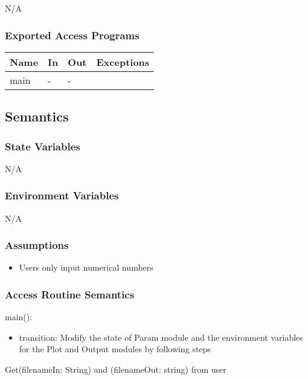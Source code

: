 \documentclass[12pt, titlepage]{article}
\begin{document}
N/A
\subsubsection{Exported Access Programs}

\begin{center}
\begin{tabular}{p{4cm} p{2cm} p{2cm} p{6cm}}
\hline
\textbf{Name} & \textbf{In} & \textbf{Out} & \textbf{Exceptions} \\
\hline
main & - & - &  \\
\hline
\end{tabular}
\end{center}

\subsection{Semantics}

\subsubsection{State Variables}
N/A

\subsubsection{Environment Variables}
N/A

\subsubsection{Assumptions}
\begin{itemize}
  \item Users only input numerical numbers
\end{itemize}

\subsubsection{Access Routine Semantics}

\noindent main():
\begin{itemize}
\item transition: Modify the state of Param module and the environment variables for the Plot and Output modules by following steps\\
\end{itemize}

\noindent Get(filenameIn: String) and (filenameOut: string) from user\\
\end{document}
